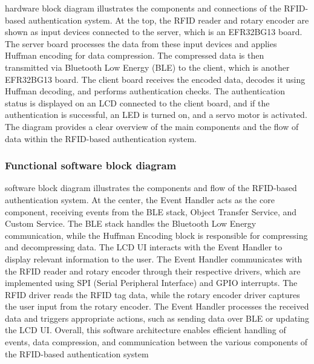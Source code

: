 \documentclass[a4paper,11pt]{article}%
\begin{document}
hardware block diagram illustrates the components and connections of the RFID-based authentication system. At the top, the RFID reader and rotary encoder are shown as input devices connected to the server, which is an EFR32BG13 board. The server board processes the data from these input devices and applies Huffman encoding for data compression. The compressed data is then transmitted via Bluetooth Low Energy (BLE) to the client, which is another EFR32BG13 board. The client board receives the encoded data, decodes it using Huffman decoding, and performs authentication checks. The authentication status is displayed on an LCD connected to the client board, and if the authentication is successful, an LED is turned on, and a servo motor is activated. The diagram provides a clear overview of the main components and the flow of data within the RFID-based authentication system.


\subsubsection{Functional software block diagram}


software block diagram illustrates the components and flow of the RFID-based authentication system. At the center, the Event Handler acts as the core component, receiving events from the BLE stack, Object Transfer Service, and Custom Service. The BLE stack handles the Bluetooth Low Energy communication, while the Huffman Encoding block is responsible for compressing and decompressing data. The LCD UI interacts with the Event Handler to display relevant information to the user. The Event Handler communicates with the RFID reader and rotary encoder through their respective drivers, which are implemented using SPI (Serial Peripheral Interface) and GPIO interrupts. The RFID driver reads the RFID tag data, while the rotary encoder driver captures the user input from the rotary encoder. The Event Handler processes the received data and triggers appropriate actions, such as sending data over BLE or updating the LCD UI. Overall, this software architecture enables efficient handling of events, data compression, and communication between the various components of the RFID-based authentication system
\end{document}
